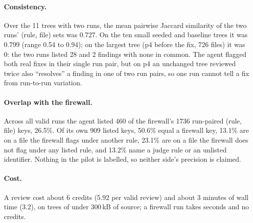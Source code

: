 \documentclass[10pt,a4paper]{article}
\begin{document}
\paragraph{Consistency.} Over the 11 trees with two runs, the mean pairwise Jaccard similarity of the two runs'
(rule, file) sets was 0.727. On the ten small seeded and baseline trees it was 0.799 (range 0.54 to 0.94); on the
largest tree (p4 before the fix, 726 files) it was 0: the two runs listed 28 and 2 findings with none in common.
The agent flagged both real fixes in their single run pair, but on p4 an unchanged tree reviewed twice also
``resolves'' a finding in one of two run pairs, so one run cannot tell a fix from run-to-run variation.

\paragraph{Overlap with the firewall.} Across all valid runs the agent listed 460 of the firewall's 1736 run-paired
(rule, file) keys, 26.5\%. Of its own 909 listed keys, 50.6\% equal a firewall key, 13.1\% are on a file the
firewall flags under another rule, 23.1\% are on a file the firewall does not flag under any listed rule, and 13.2\%
name a judge rule or an unlisted identifier. Nothing in the pilot is labelled, so neither side's precision is
claimed. %

\paragraph{Cost.} A review cost about 6 credits (5.92 per valid review) and about 3 minutes of wall time (3.2), on
trees of under 300\,kB of source; a firewall run takes seconds and no credits.
\end{document}
